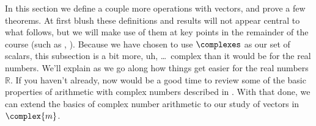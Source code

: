 %
\begin{introduction}
\begin{para}In this section we define a couple more operations with vectors, and prove a few theorems.  At first blush these definitions and results will not appear central to what follows, but we will make use of them at key points in the remainder of the course (such as , ).  Because we have chosen to use $\complexes$ as our set of scalars, this subsection is a bit more, uh, \dots\ complex than it would be for the real numbers.  We'll explain as we go along how things get easier for the real numbers ${\mathbb R}$.  If you haven't already, now would be a good time to review some of the basic properties of arithmetic with complex numbers described in .  With that done, we can extend the basics of complex number arithmetic to our study of vectors in $\complex{m}$.\end{para}
\end{introduction}
%
